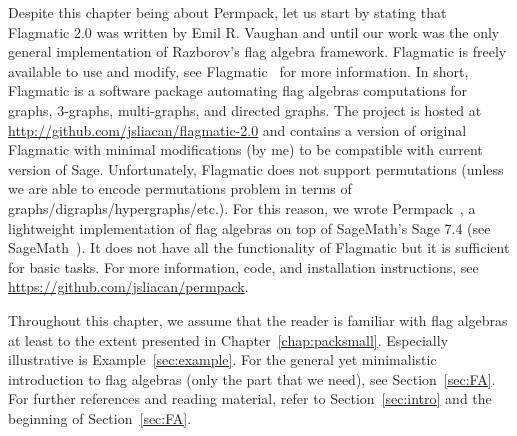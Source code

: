 Despite this chapter being about Permpack, let us start by stating that Flagmatic 2.0 was written by Emil R. Vaughan and until our work was the only general implementation of Razborov's flag algebra framework. Flagmatic is freely available to use and modify, see Flagmatic~\cite{flagmatic} for more information. In short, Flagmatic is a software package automating flag algebras computations for graphs, $3$-graphs, multi-graphs, and directed graphs. The project is hosted at \url{http://github.com/jsliacan/flagmatic-2.0} and contains a version of original Flagmatic with minimal modifications (by me) to be compatible with current version of Sage. Unfortunately, Flagmatic does not support permutations (unless we are able to encode permutations problem in terms of graphs/digraphs/hypergraphs/etc.). For this reason, we wrote Permpack~\cite{permpack}, a lightweight implementation of flag algebras on top of SageMath's Sage 7.4 (see SageMath~\cite{sagemath}). It does not have all the functionality of Flagmatic but it is sufficient for basic tasks. For more information, code, and installation instructions, see \url{https://github.com/jsliacan/permpack}. 

Throughout this chapter, we assume that the reader is familiar with flag algebras at least to the extent presented in Chapter~\ref{chap:packsmall}. Especially illustrative is Example~\ref{sec:example}. For the general yet minimalistic introduction to flag algebras (only the part that we need), see Section~\ref{sec:FA}. For further references and reading material, refer to Section~\ref{sec:intro} and the beginning of Section~\ref{sec:FA}.


